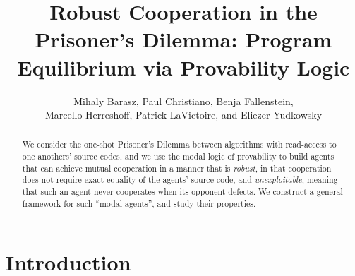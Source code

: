 \documentclass[12pt, letterpaper]{article}
\title{Robust Cooperation in the Prisoner's Dilemma: Program Equilibrium via Provability Logic}
\author{Mihaly Barasz, Paul Christiano, Benja Fallenstein,\\ Marcello Herreshoff, Patrick LaVictoire, and Eliezer Yudkowsky}
\numberwithin{equation}{section}
\begin{document}
\maketitle
\begin{abstract}
We consider the one-shot Prisoner's Dilemma between algorithms with read-access to one anothers' source codes, and we use the modal logic of provability to build agents that can achieve mutual cooperation in a manner that is \emph{robust}, in that cooperation does not require exact equality of the agents' source code, and \emph{unexploitable}, meaning that such an agent never cooperates when its opponent defects. We construct a general framework for such ``modal agents'', and study their properties.
\end{abstract}

\section{Introduction}
\end{document}
